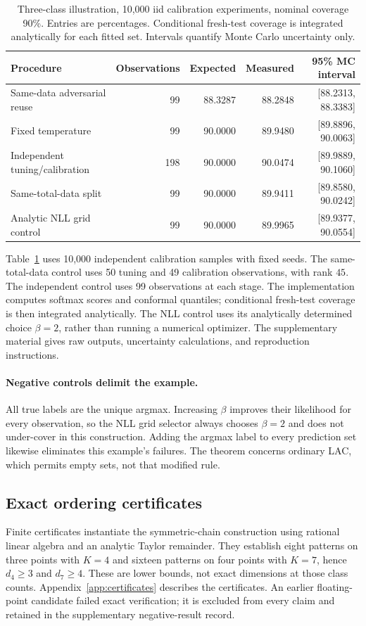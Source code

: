 \documentclass[10pt]{article}
\theoremstyle{definition}\newtheorem{definition}[theorem]{Definition}
\theoremstyle{remark}\newtheorem{remark}[theorem]{Remark}
\newcommand{\1}{\mathbf 1}
\begin{document}
\begin{table}[t]
\centering\small
\caption{Three-class illustration, 10,000 iid calibration experiments, nominal coverage 90\%. Entries are percentages. Conditional fresh-test coverage is integrated analytically for each fitted set. Intervals quantify Monte Carlo uncertainty only.}\label{tab:coverage}
\begin{tabular}{lrrrr}
\toprule
Procedure & Observations & Expected & Measured & 95\% MC interval\\
\midrule
Same-data adversarial reuse & 99 & 88.3287 & 88.2848 & [88.2313, 88.3383]\\
Fixed temperature & 99 & 90.0000 & 89.9480 & [89.8896, 90.0063]\\
Independent tuning/calibration & 198 & 90.0000 & 90.0474 & [89.9889, 90.1060]\\
Same-total-data split & 99 & 90.0000 & 89.9411 & [89.8580, 90.0242]\\
Analytic NLL grid control & 99 & 90.0000 & 89.9965 & [89.9377, 90.0554]\\
\bottomrule
\end{tabular}
\end{table}

Table~\ref{tab:coverage} uses 10,000 independent calibration samples with fixed seeds. The same-total-data control uses 50 tuning and 49 calibration observations, with rank $45$. The independent control uses 99 observations at each stage. The implementation computes softmax scores and conformal quantiles; conditional fresh-test coverage is then integrated analytically. The NLL control uses its analytically determined choice $\beta=2$, rather than running a numerical optimizer. The supplementary material gives raw outputs, uncertainty calculations, and reproduction instructions.

\paragraph{Negative controls delimit the example.}
All true labels are the unique argmax. Increasing $\beta$ improves their likelihood for every observation, so the NLL grid selector always chooses $\beta=2$ and does not under-cover in this construction. Adding the argmax label to every prediction set likewise eliminates this example's failures. The theorem concerns ordinary LAC, which permits empty sets, not that modified rule.

\subsection{Exact ordering certificates}
Finite certificates instantiate the symmetric-chain construction using rational linear algebra and an analytic Taylor remainder. They establish eight patterns on three points with $K=4$ and sixteen patterns on four points with $K=7$, hence $d_4\ge3$ and $d_7\ge4$. These are lower bounds, not exact dimensions at those class counts. Appendix~\ref{app:certificates} describes the certificates. An earlier floating-point candidate failed exact verification; it is excluded from every claim and retained in the supplementary negative-result record.
\end{document}
